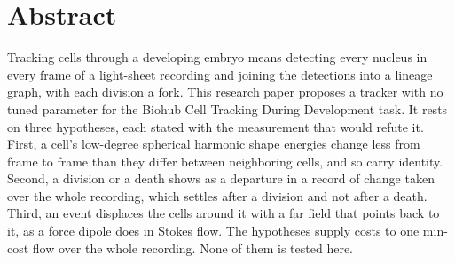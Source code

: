 \chapter*{Abstract}

Tracking cells through a developing embryo means detecting every nucleus in every frame of a
light-sheet recording and joining the detections into a lineage graph, with each division a fork.
This research paper proposes a tracker with no tuned parameter for the Biohub Cell Tracking During
Development task. It rests on three hypotheses, each stated with the measurement that would refute
it. First, a cell's low-degree spherical harmonic shape energies change less from frame to frame
than they differ between neighboring cells, and so carry identity. Second, a division or a death
shows as a departure in a record of change taken over the whole recording, which settles after a
division and not after a death. Third, an event displaces the cells around it with a far field that
points back to it, as a force dipole does in Stokes flow. The hypotheses supply costs to one
min-cost flow over the whole recording. None of them is tested here.
\cleardoublepage
